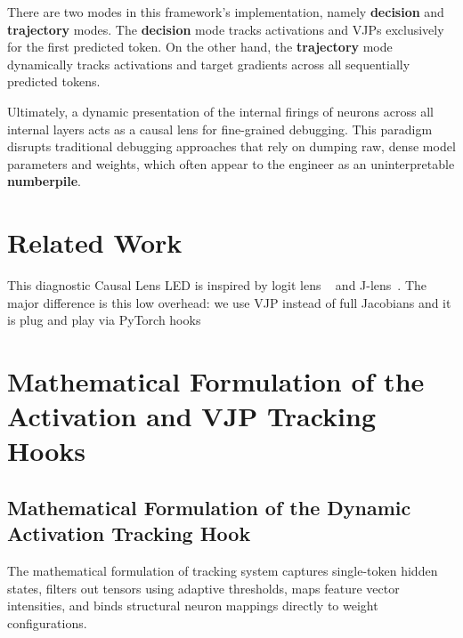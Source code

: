 \documentclass[10pt,conference]{IEEEtran}
\begin{document}
There are two modes in this framework's implementation, namely \textbf{decision} and \textbf{trajectory} modes. The \textbf{decision} mode tracks activations and VJPs exclusively for the first predicted token. On the other hand, the \textbf{trajectory} mode dynamically tracks activations and target gradients across all sequentially predicted tokens.

Ultimately, a dynamic presentation of the internal firings of neurons across all internal layers acts as a causal lens for fine-grained debugging. This paradigm disrupts traditional debugging approaches that rely on dumping raw, dense model parameters and weights, which often appear to the engineer as an uninterpretable \textbf{numberpile}.

\section{Related Work}
This diagnostic Causal Lens LED is inspired by logit lens ~\cite{nostalgebraist2020logitlens} and J-lens~\cite{gurnee2026verbalizable}. The major difference is this low overhead: we use VJP instead of full Jacobians and it is plug and play via PyTorch hooks

\section{Mathematical Formulation of the Activation and VJP Tracking Hooks}
\subsection{Mathematical Formulation of the Dynamic Activation Tracking Hook}

The mathematical formulation of tracking system captures single-token hidden states, filters out tensors using adaptive thresholds, maps feature vector intensities, and binds structural neuron mappings directly to weight configurations.
\end{document}
